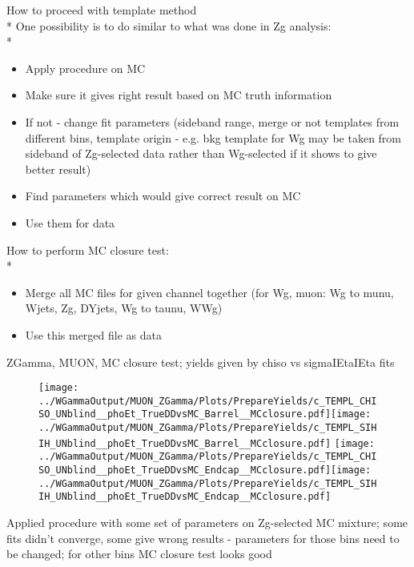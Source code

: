 \documentclass{beamer}
\begin{document}
\begin{frame}{How to proceed with template method}\\*
  \scriptsize One possibility is to do similar to what was done in Zg analysis:\\*
  \begin{itemize}
    \item \scriptsize Apply procedure on MC   
    \item \scriptsize Make sure it gives right result based on MC truth information
    \item \scriptsize If not - change fit parameters (sideband range, merge or not templates from different bins, template origin - e.g. bkg template for Wg may be taken from sideband of Zg-selected data rather than Wg-selected if it shows to give better result)
    \item \scriptsize Find parameters which would give correct result on MC
    \item \scriptsize Use them for data    
 \end{itemize} 
 \scriptsize How to perform MC closure test:\\*
 \begin{itemize}
    \item \scriptsize Merge all MC files for given channel together (for Wg, muon: Wg to munu, Wjets, Zg, DYjets, Wg to taunu, WWg)
    \item \scriptsize Use this merged file as data    
 \end{itemize} 
\end{frame}

\begin{frame}{ZGamma, MUON, MC closure test; yields given by chiso vs sigmaIEtaIEta fits}
  \begin{figure}
    \centering
    \texttt{[image: ../WGammaOutput/MUON\_ZGamma/Plots/PrepareYields/c\_TEMPL\_CHISO\_UNblind\_\_phoEt\_TrueDDvsMC\_Barrel\_\_MCclosure.pdf]}\texttt{[image: ../WGammaOutput/MUON\_ZGamma/Plots/PrepareYields/c\_TEMPL\_SIHIH\_UNblind\_\_phoEt\_TrueDDvsMC\_Barrel\_\_MCclosure.pdf]}
    \texttt{[image: ../WGammaOutput/MUON\_ZGamma/Plots/PrepareYields/c\_TEMPL\_CHISO\_UNblind\_\_phoEt\_TrueDDvsMC\_Endcap\_\_MCclosure.pdf]}\texttt{[image: ../WGammaOutput/MUON\_ZGamma/Plots/PrepareYields/c\_TEMPL\_SIHIH\_UNblind\_\_phoEt\_TrueDDvsMC\_Endcap\_\_MCclosure.pdf]}
  \end{figure}
  \scriptsize Applied procedure with some set of parameters on Zg-selected MC mixture; some fits didn't converge, some give wrong results - parameters for those bins need to be changed; for other bins MC closure test looks good
\end{frame}
\end{document}
